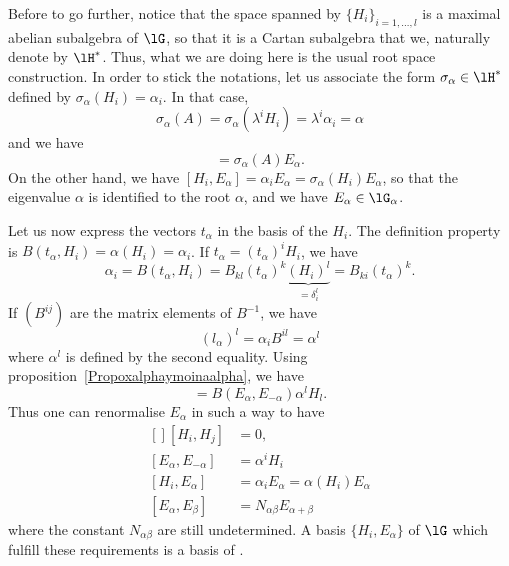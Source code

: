 Before to go further, notice that the space spanned by $\{ H_i \}_{i=1,\ldots,l}$ is a maximal abelian subalgebra of $\lG$, so that it is a Cartan subalgebra that we,  naturally denote by $\lH^*$. Thus, what we are doing here is the usual root space construction. In order to stick the notations, let us associate the form $\sigma_{\alpha}\in\lH^*$ defined by $\sigma_{\alpha}(H_i)=\alpha_i$. In that case,
\begin{equation}
	\sigma_{\alpha}(A)=\sigma_{\alpha}(\lambda^iH_i)=\lambda^i\alpha_i=\alpha
\end{equation}
and we have
\begin{equation}
	[A,E_{\alpha}]=\sigma_{\alpha}(A)E_{\alpha}.
\end{equation}
On the other hand, we have $[H_i,E_{\alpha}]=\alpha_iE_{\alpha}=\sigma_{\alpha}(H_i)E_{\alpha}$, so that the eigenvalue $\alpha$ is identified to the root $\alpha$, and we have $E_{\alpha}\in\lG_{\alpha}$.

Let us now express the vectors $t_{\alpha}$ in the basis of the $H_i$. The definition property is $B(t_{\alpha},H_i)=\alpha(H_i)=\alpha_i$. If $t_{\alpha}=(t_{\alpha})^iH_i$, we have
\begin{equation}
	\alpha_i=B(t_{\alpha},H_i)=B_{kl}(t_{\alpha})^k\underbrace{(H_i)^l}_{=\delta^l_i}=B_{ki}(t_{\alpha})^k.
\end{equation}
If $(B^{ij})$ are the matrix elements of $B^{-1}$, we have
\begin{equation}
	(l_{\alpha})^l=\alpha_iB^{il}=\alpha^l
\end{equation}
where $\alpha^l$ is defined by the second equality. Using proposition~\ref{Propoxalphaymoinaalpha}, we have
\begin{equation}
	[E_{\alpha},E_{-\alpha}]=B(E_{\alpha},E_{-\alpha})\alpha^lH_l.
\end{equation}
Thus one can renormalise $E_{\alpha}$ in such a way to have
\begin{equation}
	\begin{aligned}[]
		[H_i,H_j]                & =0,                                       \\
		[E_{\alpha},E_{-\alpha}] & =\alpha^iH_i                              \\
		[H_i,E_{\alpha}]         & =\alpha_iE_{\alpha}=\alpha(H_i)E_{\alpha} \\
		[E_{\alpha},E_{\beta}]   & =N_{\alpha\beta}E_{\alpha+\beta}
	\end{aligned}
\end{equation}
where the constant $N_{\alpha\beta}$ are still undetermined. A basis $\{ H_i,E_{\alpha} \}$ of $\lG$ which fulfill these requirements is a basis of .


